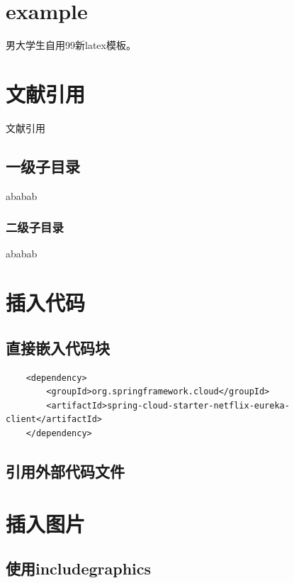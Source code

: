 \section{example}

男大学生自用99新latex模板。

\section{文献引用}

文献引用\cite[text]{example-bib}

\subsection{一级子目录}

ababab

\subsubsection{二级子目录}

ababab

\section{插入代码}


\subsection{直接嵌入代码块}

\begin{lstlisting}
    <dependency>
        <groupId>org.springframework.cloud</groupId>
        <artifactId>spring-cloud-starter-netflix-eureka-client</artifactId>
    </dependency>
\end{lstlisting}


\subsection{引用外部代码文件}




\section{插入图片}

\subsection{使用{includegraphics}}


